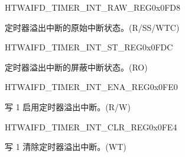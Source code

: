 \begin{register}{H}{TWAIFD\_TIMER\_INT\_RAW\_REG}{0x0FD8}\label{regdesc:TWAIFDTIMERINTRAWREG}
%
%
\regnewline%
\begin{regdesc}\begin{reglist}
\label{fielddesc:TWAIFDTIMEROVERFLOWINTRAW}\item [TWAIFD\_TIMER\_OVERFLOW\_INT\_RAW] 定时器溢出中断的原始中断状态。(R/SS/WTC)
\end{reglist}\end{regdesc}
\end{register}


\begin{register}{H}{TWAIFD\_TIMER\_INT\_ST\_REG}{0x0FDC}\label{regdesc:TWAIFDTIMERINTSTREG}
%
%
\regnewline%
\begin{regdesc}\begin{reglist}
\label{fielddesc:TWAIFDTIMEROVERFLOWINTST}\item [TWAIFD\_TIMER\_OVERFLOW\_INT\_ST] 定时器溢出中断的屏蔽中断状态。(RO)
\end{reglist}\end{regdesc}
\end{register}


\begin{register}{H}{TWAIFD\_TIMER\_INT\_ENA\_REG}{0x0FE0}\label{regdesc:TWAIFDTIMERINTENAREG}
%
%
\regnewline%
\begin{regdesc}\begin{reglist}
\label{fielddesc:TWAIFDTIMEROVERFLOWINTENA}\item [TWAIFD\_TIMER\_OVERFLOW\_INT\_ENA] 写 1 启用定时器溢出中断。(R/W)
\end{reglist}\end{regdesc}
\end{register}


\begin{register}{H}{TWAIFD\_TIMER\_INT\_CLR\_REG}{0x0FE4}\label{regdesc:TWAIFDTIMERINTCLRREG}
%
%
\regnewline%
\begin{regdesc}\begin{reglist}
\label{fielddesc:TWAIFDTIMEROVERFLOWINTCLR}\item [TWAIFD\_TIMER\_OVERFLOW\_INT\_CLR] 写 1 清除定时器溢出中断。(WT)
\end{reglist}\end{regdesc}
\end{register}


